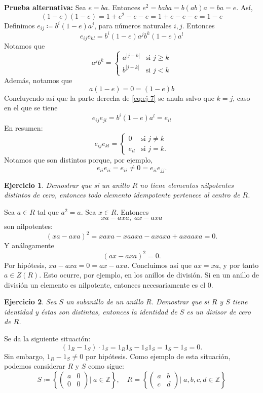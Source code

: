\documentclass[11pt]{book}
\def\Z{\mathbb{Z}}
\newtheorem{ej}{Ejercicio}
\theoremstyle{definition}
\begin{document}
\textbf{Prueba alternativa:} Sea $e=ba$. Entonces $e^2=baba=b(ab)a=ba=e$. Así,\[
(1-e)(1-e)=1+e^2-e-e=1+e-e-e=1-e
\]Definimos $e_{ij}\coloneq b^i(1-e)a^j$, para números naturales $i,j$. Entonces\begin{equation}\label{eq:ej-7}
e_{ij}e_{kl}=b^i(1-e)a^jb^k(1-e)a^l
\end{equation}Notamos que\[
a^jb^k=\left\lbrace\begin{array}{ll}
    a^{|j-k|}&\text{si }j\geq k\\
    b^{|j-k|}&\text{si }j<k
\end{array}\right.
\]Además, notamos que\[
a(1-e)=0=(1-e)b
\]Concluyendo así que la parte derecha de \ref{eq:ej-7} se anula salvo que $k=j$, caso en el que se tiene\[
e_{ij}e_{jl}=b^i(1-e)a^l=e_{il}
\]En resumen:\[
e_{ij}e_{kl}=\left\{\begin{array}{ll}
    0&\text{si }j\neq k\\
    e_{il} &\text{si }j=k.
\end{array}\right.
\]Notamos que son distintos porque, por ejemplo,\[
e_{ii}e_{ii}=e_{ii}\neq 0=e_{ii}e_{jj}.
\]

\begin{ej}
    Demostrar que si un anillo $R$ no tiene elementos nilpotentes distintos de cero, entonces todo elemento idempotente pertenece al centro de $R$.
\end{ej}
Sea $a\in R$ tal que $a^2=a$. Sea $x\in R$. Entonces\[
xa-axa,\; ax-axa
\]son nilpotentes:\[
(xa-axa)^2=xaxa-xaaxa-axaxa+axaaxa = 0.
\]Y análogamente\[
(ax-axa)^2=0.
\]Por hipótesis, $xa-axa=0=ax-axa$. Concluimos así que $ax=xa$, y por tanto $a\in Z(R)$. Esto ocurre, por ejemplo, en los anillos de división. Si en un anillo de división un elemento es nilpotente, entonces necesariamente es el 0.

\begin{ej}
    Sea $S$ un subanillo de un anillo $R$. Demostrar que si $R$ y $S$ tiene identidad y éstas son distintas, entonces la identidad de $S$ es un divisor de cero de $R$.
\end{ej}
Se da la siguiente situación:\[
(1_R-1_S)\cdot 1_S=1_R1_S-1_S1_S=1_S-1_S=0.
\]Sin embargo, $1_R-1_S\neq 0$ por hipótesis. Como ejemplo de esta situación, podemos considerar $R$ y $S$ como sigue:\[
S\coloneq \left\{\begin{pmatrix}
a&0\\0&0
\end{pmatrix}\Big|\; a\in\Z\right\},\quad R=\left\{\begin{pmatrix}
    a&b\\c&d
    \end{pmatrix}\Big|\; a,b,c,d\in\Z\right\}
\]
\end{document}
